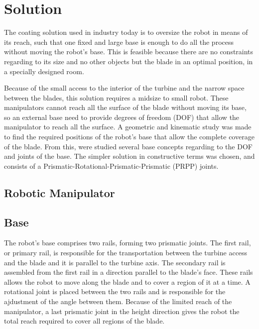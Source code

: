 \section{Solution}


The coating solution used in industry today is to oversize the robot
in means of its reach, such that one fixed and large base is enough to do all 
the process without moving the robot's base. 
This is feasible because there are no constraints regarding to its size and no
other objects but the blade in an optimal position, in a specially designed room.

Because of the small access to the interior of the turbine and the narrow space
between the blades, this solution requires a midsize to small robot. 
These manipulators cannot reach all the surface of the blade without moving its
base, so an external base need to provide degrees of freedom (DOF) that allow
the manipulator to reach all the surface.
A geometric and kinematic study was made to find the required positions of the
robot's base that allow the complete coverage of the blade.
From this, were studied several base concepts regarding to the DOF and joints of
the base. The simpler solution in constructive terms was chosen, and consists of
a Prismatic-Rotational-Prismatic-Prismatic (PRPP) joints.


\subsection{Robotic Manipulator}

\subsection{Base}

The robot's base comprises two rails, forming two prismatic joints. The first
rail, or primary rail, is responsible for the transportation between the turbine
access and the blade and it is parallel to the turbine axis. The secondary rail
is assembled from the first rail in a direction parallel to the blade's face.
These rails allows the robot to move along the blade and to cover a region of it
at a time. A rotational joint is placed between the two rails and is responsible
for the ajdustment of the angle between them.
Because of the limited reach of the manipulator, a last prismatic joint in the
height direction gives the robot the total reach required to cover all regions
of the blade.

